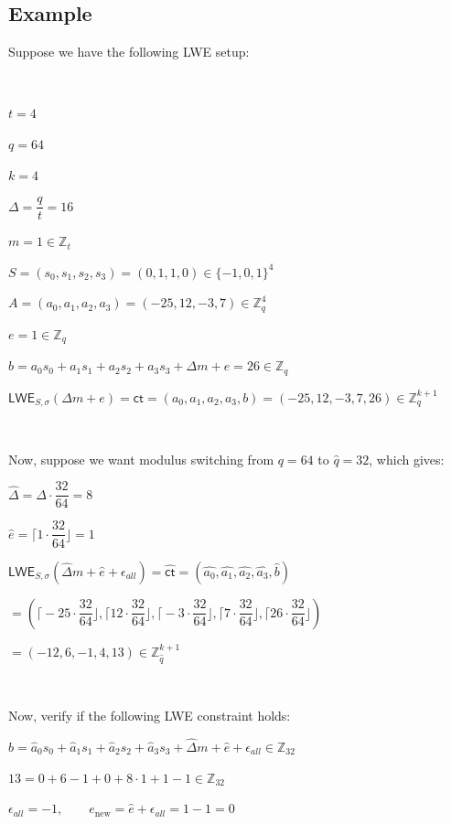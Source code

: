 \subsection{Example}

Suppose we have the following LWE setup:

$ $

$t = 4$

$q = 64$

$k = 4$

$\Delta = \dfrac{q}{t} = 16$

$m = 1 \in \mathbb{Z}_t$

$S = (s_0, s_1, s_2, s_3) = (0, 1, 1, 0) \in \{-1, 0, 1\}^4$

$A = (a_0, a_1, a_2, a_3) = (-25, 12, -3, 7) \in \mathbb{Z}_q^4$

$e = 1 \in \mathbb{Z}_q$

$b = a_0s_0 + a_1s_1 + a_2s_2 + a_3s_3 + \Delta m + e = 26 \in \mathbb{Z}_q$

$\textsf{LWE}_{S, \sigma}(\Delta m + e) = \textsf{ct} = (a_0, a_1, a_2, a_3, b) = (-25, 12, -3, 7, 26) \in \mathbb{Z}_q^{k+1}$

$ $

Now, suppose we want modulus switching from $q=64$ to $\hat{q} = 32$, which gives:

$\hat{\Delta} = \Delta\cdot\dfrac{32}{64} = 8$

$\hat{e} = \Big\lceil 1 \cdot \dfrac{32}{64} \Big\rfloor = 1$

$\textsf{LWE}_{S, \sigma}(\hat{\Delta} m + \hat{e} + \epsilon_{\textit{all}}) = \hat{\textsf{ct}} = (\hat{a_0}, \hat{a_1}, \hat{a_2}, \hat{a_3}, \hat{b})$

$ = \left(\Big\lceil -25\cdot\dfrac{32}{64}\Big\rfloor, \Big\lceil12\cdot\dfrac{32}{64}\Big\rfloor, \Big\lceil-3\cdot\dfrac{32}{64}\Big\rfloor, \Big\lceil7\cdot\dfrac{32}{64}\Big\rfloor, \Big\lceil26\cdot\dfrac{32}{64}\Big\rfloor\right)$

$ = (-12, 6, -1, 4, 13) \in \mathbb{Z}_{\hat{q}}^{k+1}$

$ $

Now, verify if the following LWE constraint holds:

$\hat{b} = \hat{a}_0s_0 + \hat{a}_1s_1 + \hat{a}_2s_2 + \hat{a}_3s_3 + \hat{\Delta}m + \hat{e}+\epsilon_{\textit{all}} \in \mathbb{Z}_{32}$

$13 = 0 + 6 - 1 + 0 + 8 \cdot 1 + 1 - 1 \in \mathbb{Z}_{32}$

$\epsilon_{\textit{all}}=-1,\qquad e_{\mathrm{new}}=\hat e+\epsilon_{\textit{all}}=1-1=0$

